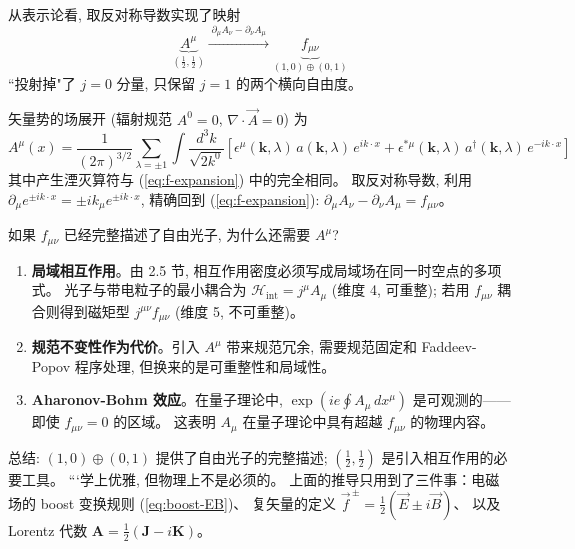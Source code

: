 从表示论看, 取反对称导数实现了映射
\begin{equation}
    \underbrace{A^\mu}_{(\frac{1}{2},\frac{1}{2})}
    \xrightarrow{\;\partial_\mu A_\nu - \partial_\nu A_\mu\;}
    \underbrace{f_{\mu\nu}}_{(1,0)\oplus(0,1)}
\end{equation}
``投射掉"了 $j=0$ 分量, 只保留 $j=1$ 的两个横向自由度。

矢量势的场展开 (辐射规范 $A^0=0$, $\nabla\cdot\vec{A}=0$) 为
\begin{equation}
    A^\mu(x) = \frac{1}{(2\pi)^{3/2}} \sum_{\lambda=\pm 1}
    \int \frac{d^3k}{\sqrt{2k^0}}
    \left[\epsilon^\mu(\mathbf{k},\lambda)\,a(\mathbf{k},\lambda)\,e^{ik\cdot x}
    + \epsilon^{*\mu}(\mathbf{k},\lambda)\,a^\dagger(\mathbf{k},\lambda)\,e^{-ik\cdot x}\right]
\end{equation}
其中产生湮灭算符与 (\ref{eq:f-expansion}) 中的完全相同。
取反对称导数, 利用 $\partial_\mu e^{\pm ik\cdot x}=\pm ik_\mu e^{\pm ik\cdot x}$,
精确回到 (\ref{eq:f-expansion}): $\partial_\mu A_\nu - \partial_\nu A_\mu = f_{\mu\nu}$。



如果 $f_{\mu\nu}$ 已经完整描述了自由光子, 为什么还需要 $A^\mu$?

\begin{enumerate}
    \item \textbf{局域相互作用}。由 2.5 节, 相互作用密度必须写成局域场在同一时空点的多项式。
    光子与带电粒子的最小耦合为 $\mathscr{H}_{\text{int}}=j^\mu A_\mu$ (维度 4, 可重整);
    若用 $f_{\mu\nu}$ 耦合则得到磁矩型 $j^{\mu\nu}f_{\mu\nu}$ (维度 5, 不可重整)。

    \item \textbf{规范不变性作为代价}。引入 $A^\mu$ 带来规范冗余, 需要规范固定和 Faddeev-Popov 程序处理,
    但换来的是可重整性和局域性。

    \item \textbf{Aharonov-Bohm 效应}。在量子理论中,
    $\exp(ie\oint A_\mu\,dx^\mu)$ 是可观测的——即使 $f_{\mu\nu}=0$ 的区域。
    这表明 $A_\mu$ 在量子理论中具有超越 $f_{\mu\nu}$ 的物理内容。
\end{enumerate}

总结: $(1,0)\oplus(0,1)$ 提供了自由光子的完整描述;
$(\frac{1}{2},\frac{1}{2})$ 是引入相互作用的必要工具。
```学上优雅, 但物理上不是必须的。
上面的推导只用到了三件事：电磁场的 boost 变换规则 (\ref{eq:boost-EB})、
复矢量的定义 $\vec{f}^{\,\pm}=\frac{1}{2}(\vec{E}\pm i\vec{B})$、
以及 Lorentz 代数 $\boldsymbol{A}=\frac{1}{2}(\boldsymbol{J}-i\boldsymbol{K})$。